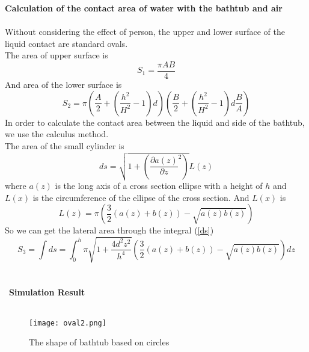 \documentclass{mcmthesis}
\begin{document}
\textbf{Calculation of the contact area of water with the bathtub and air} \\\\
\indent Without considering the effect of person, the upper and lower surface of the liquid contact are standard ovals.\\
\indent The area of upper surface is\\
\begin{equation}
S_{1}=\frac{\pi AB}{4}
\end{equation}
\indent And area of the lower surface is\\
\begin{equation}
	S_{2}=\pi (\frac{A}{2}+(\frac{h^{2}}{H^{2}}-1)d)(\frac{B}{2}+(\frac{h^{2}}{H^{2}}-1)d\frac{B}{A})
\end{equation}
\indent In order to calculate the contact area between the liquid and side of the bathtub, we use the calculus method.\\
\indent The area of the small cylinder is 
\begin{equation}
ds=\sqrt{1+(\frac{\partial a(z)}{\partial z}^{2})} L(z)
\label{ds}
\end{equation}
\indent where $a(z)$ is the long axis of a cross section ellipse with a height of $h$ and $L(x)$ is the circumference of the ellipse of the cross section. And $L(x)$ is
\begin{equation}
L(z)=\pi (\frac{3}{2}(a(z)+b(z))-\sqrt{a(z)b(z)})
\end{equation} 
\indent So we can get the lateral area through the integral (\ref{ds})
\begin{equation}
	S_{3}=\int ds=\int_{0}^{h}\pi \sqrt{1+\frac{4d^{2}z^{2}}{h^{4}}}(\frac{3}{2}(a(z)+b(z))-\sqrt{a(z)b(z)})dz
\end{equation}\\\\
\noindent\
\textbf{Simulation Result}\\\\
\begin{figure}[H]
	\centerline{\texttt{[image: oval2.png]}}
	\caption{The shape of bathtub based on circles}
	\label{circle}	
\end{figure}
\end{document}
